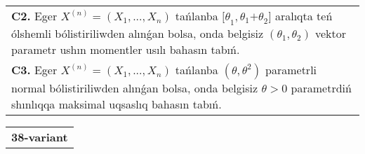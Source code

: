 \documentclass{article}
\begin{document}
\begin{tabular}{m{17cm}}
 \\
\textbf{C2.} 
Eger \(X^{(n)} = \left( X_{1},...,X_{n} \right)\) tańlanba \({\lbrack\theta}_{1},\theta_{1}{+ \theta}_{2}\rbrack\) aralıqta teń ólshemli bólistiriliwden alınǵan bolsa, onda belgisiz \(\left( \theta_{1},\theta_{2} \right)\) vektor parametr ushın momentler usılı bahasın tabıń.
 \\
\textbf{C3.} 
Eger \(X^{(n)} = \left( X_{1},...,X_{n} \right)\) tańlanba \(\left( \theta,\theta^{2} \right)\) parametrli normal bólistiriliwden alınǵan bolsa, onda belgisiz \(\theta > 0\) parametrdiń shınlıqqa maksimal uqsaslıq bahasın tabıń.
 \\

\end{tabular}
\vspace{1cm}


\begin{tabular}{m{17cm}}
\textbf{38-variant}
\newline


\end{tabular}
\end{document}
